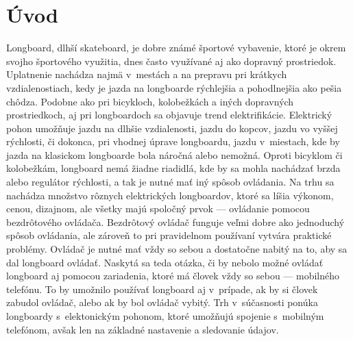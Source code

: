 %



\chapter{Úvod}\label{uvod}

Longboard, dlhší skateboard, je dobre známé športové vybavenie, ktoré je okrem svojho športového využitia, dnes často využívané aj ako dopravný prostriedok. 
Uplatnenie nachádza najmä v~mestách a na prepravu pri krátkych vzdialenostiach, kedy je jazda na longboarde rýchlejšia a pohodlnejšia ako pešia chôdza. 
Podobne ako pri bicykloch, kolobežkách a iných dopravných prostriedkoch, aj pri longboardoch sa objavuje trend elektrifikácie. 
Elektrický pohon umožňuje jazdu na dlhšie vzdialenosti, jazdu do kopcov, jazdu vo vyššej rýchlosti, či dokonca, pri vhodnej úprave longboardu, jazdu v~miestach, kde by jazda na klasickom longboarde bola náročná alebo nemožná.
Oproti bicyklom či kolobežkám, longboard nemá žiadne riadidlá, kde by sa mohla nachádzať brzda alebo regulátor rýchlosti, a tak je nutné mať iný spôsob ovládania. 
Na trhu sa nachádza množstvo rôznych elektrických longboardov, ktoré sa líšia výkonom, cenou, dizajnom, ale všetky majú spoločný prvok --- ovládanie pomocou bezdrôtového ovládača.
Bezdrôtový ovládač funguje veľmi dobre ako jednoduchý spôsob ovládania, ale zároveň to pri pravidelnom používaní vytvára praktické problémy.
Ovládač je nutné mať vždy so sebou a dostatočne nabitý na to, aby sa dal longboard ovládať.
Naskytá sa teda otázka, či by nebolo možné ovládať longboard aj pomocou zariadenia, ktoré má človek vždy so sebou --- mobilného telefónu.
To by umožnilo používať longboard aj v~prípade, ak by si človek zabudol ovládač, alebo ak by bol ovládač vybitý.
Trh v~súčasnosti ponúka longboardy s~elektonickým pohonom, ktoré umožňujú spojenie s~mobilným telefónom, avšak len na základné nastavenie a sledovanie údajov.

